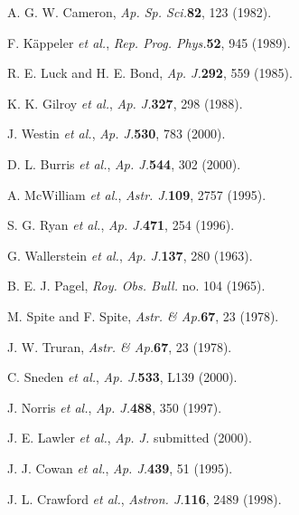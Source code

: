                                                                                                                                                                                                                                                                                                                                                                                                                                                                                                                                                                                                                                                                                                                                                                                                                                                                                                                                                                                                                                                                                                                                                                                                                                                                                                                                                                                                                                                                                                                                                                                                                                                                                                                                                                                                                                                                                                                                                                                                                                                                                                                                                                                                                                                                                                                                                                                                                                                                                                                                                                                                                                                                                                                                                                                                                                                                                                                                                                                                                                                                                                                                                                                                                                                                                                                                                                                                                                                                                                                                                                                                                                                                                                                                                                                                                                                                                                                                                                                                                                                                                                                                                                                                                                                                                                                                                                                                                                                                                                                                                                                                                                                                                                                                                                                                                                                                                                                                                                                                                                                                                                                                                                                                                                                                                                                                                                                                                                                                                                                                                                                                                                                                                                                                                                                                                                                                                                                                                                                                                                                                                                                                                                                                                                                                                                                                                                                                                                                                                                                                                                                                                                                                                                                                                                                                                                                                                                                                                                                                                                                                                                                                                                                                                                                                                                                                                                                                                                                                                                                                                                                                                                                                                                                                                                                                                                                                                                                                                                                                                                                                                                                                                                                                                                                                                                                                                                                                                                                                                                                                                                                                                                                                                                                                                                                                                                                                                                                                                                                                                                                                                                                                                                                                                                                                                                                                                                                                                                                                                                                                                                                                                                                                                                                                                                                                                                                                                                                                                                                                                                                                                                                                                                                                                                                                                                                                                                                                                                                                                                                                                                                                                                                                                                                                                                                                                                                                                                                                                                                                                                                                                                                                                                                                                                                                                                                                                                                                                                                                                                                                                                                                                                                                                                                                                                                                                                                                                                                                                                                                                                                                                                                                                                                                                                                                                                                                                                                                                                                                                                                                                                                                                                                                                                                                                                                                                                                                                                                                                                                                                                                                                                                                                                                                                                                                                                                                                                                                                                                                                                                                                                                                                                                                                                                                                                                                                                                                                                                                                                                                                                                                                                                                                                                                                                                                                                                                                                                                                                                                                                                                                                                                                                                                                                                                                                                                                                                                                                                                                                                                                                                                                                                                                                                                                                                                                                                                                                                                                                                                                                                                                                                                                                                                                                                                                                                            \documentclass{ws-p8-50x6-00}
\begin{document}
\begin{thebibliography}{99}

A. G. W. Cameron, {\it Ap. Sp. Sci.}{\bf 82}, 123 (1982).

F. K{\"a}ppeler {\it et al.}, {\it Rep. Prog. Phys.}{\bf 52}, 945 (1989).

R. E. Luck and H. E. Bond, {\it Ap. J.}{\bf 292}, 559 (1985).

K. K. Gilroy {\it et al.}, {\it Ap. J.}{\bf 327}, 298 (1988).

J. Westin {\it et al.}, {\it Ap. J.}{\bf 530}, 783 (2000).

D. L. Burris {\it et al.}, {\it Ap. J.}{\bf 544}, 302 (2000).

A. McWilliam {\it et al.}, {\it Astr. J.}{\bf 109}, 2757 (1995).

S. G. Ryan {\it et al.}, {\it Ap. J.}{\bf 471}, 254 (1996).

G. Wallerstein {\it et al.}, {\it Ap. J.}{\bf 137}, 280 (1963).

B. E. J. Pagel, {\it Roy. Obs. Bull.} no. 104 (1965).

M. Spite and F. Spite, {\it Astr. \& Ap.}{\bf 67}, 23 (1978).

J. W. Truran, {\it Astr. \& Ap.}{\bf 67}, 23 (1978).

C. Sneden {\it et al.}, {\it Ap. J.}{\bf 533}, L139 (2000).

J. Norris {\it et al.}, {\it Ap. J.}{\bf 488}, 350 (1997).

J. E. Lawler {\it et al.}, {\it Ap. J.} submitted (2000).

J. J. Cowan {\it et al.}, {\it Ap. J.}{\bf 439}, 51 (1995).

J. L. Crawford {\it et al.}, {\it Astron. J.}{\bf 116}, 2489 (1998).

\end{thebibliography}
\end{document}
